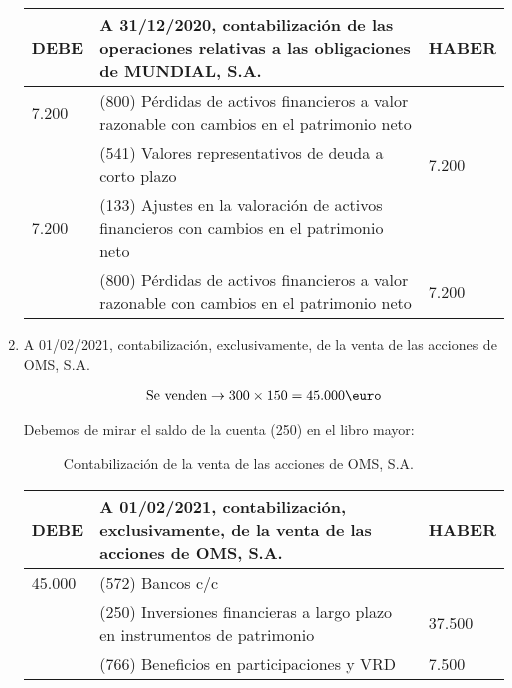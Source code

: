 \begin{enumerate}[label=\alph*)]
    \begin{table}[H]
        \centering
        \begin{tabular}{|p{3cm}|p{6cm}|p{3cm}|}
        \hline
        \rowcolor{blue!30}
        \textbf{DEBE} & \textbf{A 31/12/2020, contabilización de las operaciones relativas a las obligaciones de MUNDIAL, S.A.} & \textbf{HABER} \\
        \hline
        7.200 & (800) Pérdidas de activos financieros a valor razonable con cambios en el patrimonio neto & \\
        \hline
        & (541) Valores representativos de deuda a corto plazo & 7.200 \\
        \hline
        7.200 & (133) Ajustes en la valoración de activos financieros con cambios en el patrimonio neto & \\
        \hline
        & (800) Pérdidas de activos financieros a valor razonable con cambios en el patrimonio neto & 7.200 \\
        \hline
        \end{tabular}
    \end{table}

    \item A 01/02/2021, contabilización, exclusivamente, de la venta de las acciones de OMS, S.A.
    
    \begin{align*}
        \text{Se venden} \rightarrow 300 \times 150 = 45.000 \text{\euro}
    \end{align*}

    Debemos de mirar el saldo de la cuenta (250) en el libro mayor:

    \begin{figure}[H]
        \centering
        \caption{Contabilización de la venta de las acciones de OMS, S.A.}
    \end{figure}

    \begin{table}[H]
        \centering
        \begin{tabular}{|p{3cm}|p{6cm}|p{3cm}|}
        \hline
        \rowcolor{blue!30}
        \textbf{DEBE} & \textbf{A 01/02/2021, contabilización, exclusivamente, de la venta de las acciones de OMS, S.A.} & \textbf{HABER} \\
        \hline
        45.000 & (572) Bancos c/c & \\
        \hline
        & (250) Inversiones financieras a largo plazo en instrumentos de patrimonio & 37.500 \\
        \hline
        & (766) Beneficios en participaciones y VRD & 7.500 \\
        \hline
        \end{tabular}
    \end{table}


\end{enumerate}
